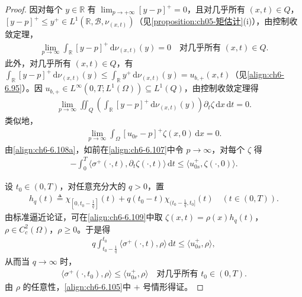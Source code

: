 \documentclass[../../main.tex]{subfiles}%
\begin{document}
\begin{proof}
因对每个 $y\in\mathbb{R}$ 有 $\lim_{p\to+\infty}[y-p]^+=0$，且对几乎所有 $(x,t)\in Q$，$[y-p]^+\leqslant y^+\in L^1(\mathbb{R},\mathscr{B},\nu_{(x,t)})$（见\cref{proposition:ch05-矩估计}(i)），由控制收敛定理，
\begin{align*}
\lim_{p\to\infty}\int_\mathbb{R}[y-p]^+\,\mathrm{d}\nu_{(x,t)}(y)=0
\quad\text{对几乎所有 }(x,t)\in Q.
\end{align*}
此外，对几乎所有 $(x,t)\in Q$，有 $\int_\mathbb{R}[y-p]^+\,\mathrm{d}\nu_{(x,t)}(y)\leqslant\int_\mathbb{R}y^+\,\mathrm{d}\nu_{(x,t)}(y)=u_{b,+}(x,t)$（见\eqref{align:ch6-6.95}）。因 $u_{b,+}\in L^\infty(0,T;L^1(\Omega))\subseteq L^1(Q)$，由控制收敛定理得
\begin{align}
\lim_{p\to\infty}\iint_Q\left(\int_\mathbb{R}[y-p]^+\,\mathrm{d}\nu_{(x,t)}(y)\right)\partial_t\zeta\,\mathrm{d}x\,\mathrm{d}t=0. \label{align:ch6-6.108a}
\end{align}
类似地，
\begin{align}
\lim_{p\to\infty}\int_\Omega[u_{0r}-p]^+\zeta(x,0)\,\mathrm{d}x=0. \label{align:ch6-6.108b}
\end{align}
由\eqref{align:ch6-6.108a}，如前在\eqref{align:ch6-6.107}中令 $p\to\infty$，对每个 $\zeta$ 得
\begin{align}
-\int_0^T\langle\sigma^+(\cdot,t),\partial_t\zeta(\cdot,t)\rangle\,\mathrm{d}t
\leqslant\langle u^+_{0s},\zeta(\cdot,0)\rangle. \label{align:ch6-6.109}
\end{align}

设 $t_0\in(0,T)$，对任意充分大的 $q>0$，置
\begin{align*}
h_q(t)\triangleq \chi_{[0,t_0-\frac{1}{q}]}(t)+q(t_0-t)\chi_{(t_0-\frac{1}{q},t_0]}(t) \quad(t\in(0,T)).
\end{align*}
由标准逼近论证，可在\eqref{align:ch6-6.109}中取 $\zeta(x,t)=\rho(x)h_q(t)$，$\rho\in C^2_c(\Omega)$，$\rho\geqslant0$。于是得
\begin{align*}
q\int_{t_0-\frac{1}{q}}^{t_0}\langle\sigma^+(\cdot,t),\rho\rangle\,\mathrm{d}t\leqslant\langle u^+_{0s},\rho\rangle,
\end{align*}
从而当 $q\to\infty$ 时，
\begin{align*}
\langle\sigma^+(\cdot,t_0),\rho\rangle\leqslant\langle u^+_{0s},\rho\rangle
\quad\text{对几乎所有 }t_0\in(0,T).
\end{align*}
由 $\rho$ 的任意性，\eqref{align:ch6-6.105}中 $+$ 号情形得证。


\end{proof}
\end{document}
